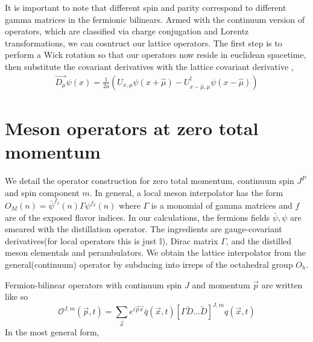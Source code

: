 It is important to note that different spin and parity correspond to different gamma matrices in the fermionic bilinears. Armed with the continuum version of operators, which are classified via charge conjugation and Lorentz transformations, we can cosntruct our lattice operators. The first step is to perform a Wick rotation so that our operators now reside in euclidean spacetime, then substitute the covariant derivatives with the lattice covariant derivative \cite{G_ckeler_1996}, 
\begin{align}
    \overrightarrow{D_\mu}\psi(x) = \frac{1}{2a}(U_{x,\mu}\psi(x + \hat{\mu}) - U_{x-\hat{\mu},\mu}^\dagger\psi(x - \hat{\mu}))
\end{align}

\section{Meson operators at zero total momentum}
We detail the operator construction for zero total momentum, continuum spin $J^P$ and spin component $m$. In general, a local meson interpolator has the form $O_M(n) = \bar{\psi}^{f_1}(n)\Gamma\psi^{f_2}(n)$ where $\Gamma$ is a monomial of gamma matrices and $f$ are of the exposed flavor indices. In our calculations, the fermions fields $\bar{\psi},\psi$ are smeared with the distillation operator. The ingredients are gauge-covariant derivatives(for local operators this is just $\mathbb{I}$), Dirac matrix $\Gamma$, and the distilled meson elementals and perambulators. We obtain the lattice interpolator from the general(continuum) operator by subducing into irreps of the octahedral group $O_h$. 

Fermion-bilinear operators with continuum spin $J$ and momentum $\vec{p}$ are written like so \cite{Cheung_2017}
    \begin{equation}
    \mathcal{O}^{J,m}(\vec{p},t) = \sum_{\vec{x}} e^{i\vec{p}\vec{x}} \bar{q}(\vec{x},t) [\Gamma \overleftrightarrow{D}\dots \overleftrightarrow{D}]^{J,m}q(\vec{x},t)
\end{equation}
In the most general form,

